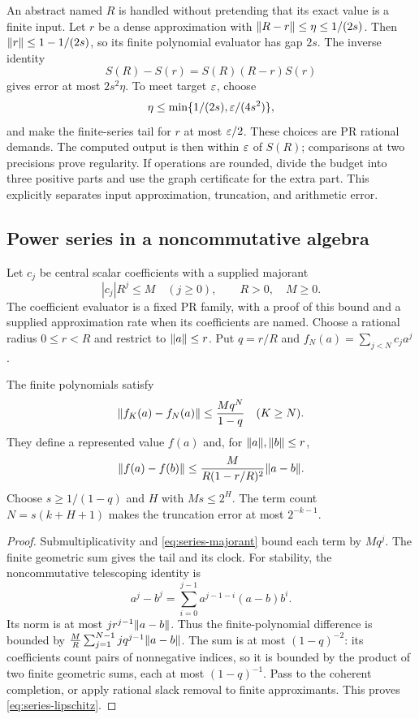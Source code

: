 An abstract named $R$ is handled without pretending that its exact value is a finite input. Let $r$ be a dense approximation with $\lVert R-r\rVert\le\eta\le1/(2s)$. Then $\lVert r\rVert\le1-1/(2s)$, so its finite polynomial evaluator has gap $2s$. The inverse identity
\[
 S(R)-S(r)=S(R)(R-r)S(r)
\]
gives error at most $2s^2\eta$. To meet target $\varepsilon$, choose
\[
 \eta\le\min\{1/(2s),\varepsilon/(4s^2)\},
\]
and make the finite-series tail for $r$ at most $\varepsilon/2$. These choices are PR rational demands. The computed output is then within $\varepsilon$ of $S(R)$; comparisons at two precisions prove regularity. If operations are rounded, divide the budget into three positive parts and use the graph certificate for the extra part. This explicitly separates input approximation, truncation, and arithmetic error.

\subsection{Power series in a noncommutative algebra}

Let $c_j$ be central scalar coefficients with a supplied majorant
\begin{equation}\label{eq:series-majorant}
 |c_j|R^j\le M\quad(j\ge0),\qquad R>0,\quad M\ge0.
\end{equation}
The coefficient evaluator is a fixed PR family, with a proof of this bound and a supplied approximation rate when its coefficients are named. Choose a rational radius $0\le r<R$ and restrict to $\lVert a\rVert\le r$. Put $q=r/R$ and $f_N(a)=\sum_{j<N}c_ja^j$.

\begin{theorem}\label{thm:analytic-evaluation}
The finite polynomials satisfy
\[
 \lVert f_K(a)-f_N(a)\rVert\le\frac{M q^N}{1-q}\quad(K\ge N).
\]
They define a represented value $f(a)$ and, for $\lVert a\rVert,\lVert b\rVert\le r$,
\begin{equation}\label{eq:series-lipschitz}
 \lVert f(a)-f(b)\rVert\le\frac{M}{R(1-r/R)^2}\lVert a-b\rVert.
\end{equation}
Choose $s\ge1/(1-q)$ and $H$ with $Ms\le2^H$. The term count $N=s(k+H+1)$ makes the truncation error at most $2^{-k-1}$.
\end{theorem}
\begin{proof}
Submultiplicativity and \eqref{eq:series-majorant} bound each term by $Mq^j$. The finite geometric sum gives the tail and its clock. For stability, the noncommutative telescoping identity is
\[
 a^j-b^j=\sum_{i=0}^{j-1}a^{j-1-i}(a-b)b^i.
\]
Its norm is at most $jr^{j-1}\lVert a-b\rVert$. Thus the finite-polynomial difference is bounded by
$\frac MR\sum_{j=1}^{N-1}j q^{j-1}\lVert a-b\rVert$.
The sum is at most $(1-q)^{-2}$: its coefficients count pairs of nonnegative indices, so it is bounded by the product of two finite geometric sums, each at most $(1-q)^{-1}$. Pass to the coherent completion, or apply rational slack removal to finite approximants. This proves \eqref{eq:series-lipschitz}.
\end{proof}

